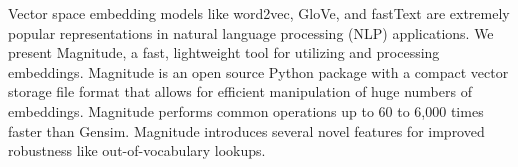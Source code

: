Vector space embedding models like word2vec, GloVe, and fastText are extremely popular representations in natural language processing (NLP) applications.  We present Magnitude, a fast, lightweight tool for utilizing and processing embeddings.  Magnitude is an open source Python package with a compact vector storage file format that allows for efficient manipulation of huge numbers of embeddings.  Magnitude performs common operations up to 60 to 6,000 times faster than Gensim. Magnitude introduces several novel features for improved robustness like out-of-vocabulary lookups.
